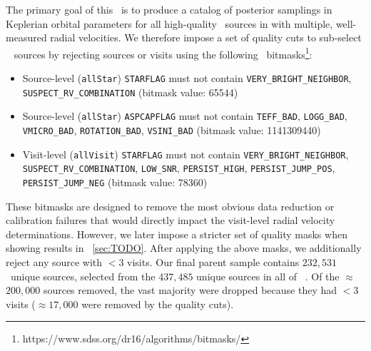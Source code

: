 \documentclass[modern]{aastex63}
\newcommand{\nsources}{\ensuremath{232,531}}
\begin{document}
The primary goal of this \documentname\ is to produce a catalog of posterior
samplings in Keplerian orbital parameters for all high-quality \apogee\ sources
in  with multiple, well-measured radial velocities.
We therefore impose a set of quality cuts to sub-select \apogee\  sources
by rejecting sources or visits using the following \apogee\
bitmasks\footnote{https://www.sdss.org/dr16/algorithms/bitmasks/}:
\begin{itemize}
    \item Source-level (\texttt{allStar}) \texttt{STARFLAG} must not contain
    \texttt{VERY\_BRIGHT\_NEIGHBOR}, \texttt{SUSPECT\_RV\_COMBINATION} (bitmask
    value: 65544)
    \item Source-level (\texttt{allStar}) \texttt{ASPCAPFLAG} must not contain
    \texttt{TEFF\_BAD}, \texttt{LOGG\_BAD}, \texttt{VMICRO\_BAD},
    \texttt{ROTATION\_BAD}, \texttt{VSINI\_BAD} (bitmask value: 1141309440)
    \item Visit-level (\texttt{allVisit}) \texttt{STARFLAG} must not contain
    \texttt{VERY\_BRIGHT\_NEIGHBOR}, \texttt{SUSPECT\_RV\_COMBINATION},
    \texttt{LOW\_SNR}, \texttt{PERSIST\_HIGH}, \texttt{PERSIST\_JUMP\_POS},
    \texttt{PERSIST\_JUMP\_NEG} (bitmask value: 78360)
\end{itemize}
These bitmasks are designed to remove the most obvious data reduction or
calibration failures that would directly impact the visit-level radial velocity
determinations.
However, we later impose a stricter set of quality masks when showing results in
\sectionname~\ref{sec:TODO}.
After applying the above masks, we additionally reject any source with $<3$
visits.
Our final parent sample contains \nsources\ unique sources, selected from the
$437,485$ unique sources in all of \apogee\ \dr{16}.
Of the $\approx$$200,000$ sources removed, the vast majority were dropped
because they had $<3$ visits ($\approx$$17,000$ were removed by the quality
cuts).
\end{document}
